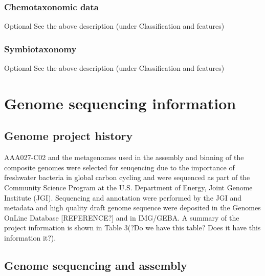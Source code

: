 \documentclass{bmcart}
\begin{document}
\subsubsection*{Chemotaxonomic data}
Optional
See the above description (under Classification and features)

\subsubsection*{Symbiotaxonomy}
Optional
See the above description (under Classification and features)


\section*{Genome sequencing information}

\subsection*{Genome project history}
AAA027-C02 and the metagenomes used in the assembly and binning of the composite genomes were selected for seuqencing due to the importance of freshwater bacteria in global carbon cycling and were sequenced as part of the Community Science Program at the U.S. Department of Energy, Joint Genome Institute (JGI).  Sequencing and annotation were performed by the JGI and metadata and high quality draft genome sequence were deposited in the Genomes OnLine Database [REFERENCE?] and in IMG/GEBA.  A summary of the project information is shown in Table 3(?Do we have this table? Does it have this information it?).

\subsection*{Genome sequencing and assembly}
\end{document}
